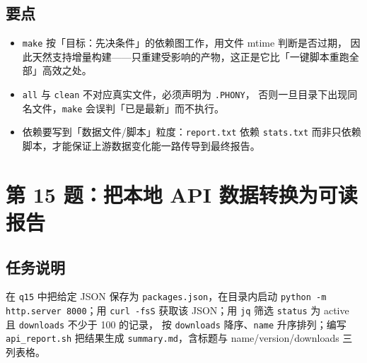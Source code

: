 \documentclass{hamesome-report}
\begin{document}
\subsection{要点}
\begin{itemize}
\item \texttt{make} 按「目标：先决条件」的依赖图工作，用文件 mtime 判断是否过期，
因此天然支持增量构建——只重建受影响的产物，这正是它比「一键脚本重跑全部」高效之处。
\item \texttt{all} 与 \texttt{clean} 不对应真实文件，必须声明为 \texttt{.PHONY}，
否则一旦目录下出现同名文件，\texttt{make} 会误判「已是最新」而不执行。
\item 依赖要写到「数据文件/脚本」粒度：\texttt{report.txt} 依赖
\texttt{stats.txt} 而非只依赖脚本，才能保证上游数据变化能一路传导到最终报告。
\end{itemize}

\section{第 15 题：把本地 API 数据转换为可读报告}
\subsection{任务说明}
在 \texttt{q15} 中把给定 JSON 保存为 \texttt{packages.json}，在目录内启动
\texttt{python -m http.server 8000}；用 \texttt{curl -fsS} 获取该 JSON；用
\texttt{jq} 筛选 \texttt{status} 为 active 且 \texttt{downloads} 不少于 100 的记录，
按 \texttt{downloads} 降序、\texttt{name} 升序排列；编写 \texttt{api\_report.sh}
把结果生成 \texttt{summary.md}，含标题与 name/version/downloads 三列表格。
\end{document}
